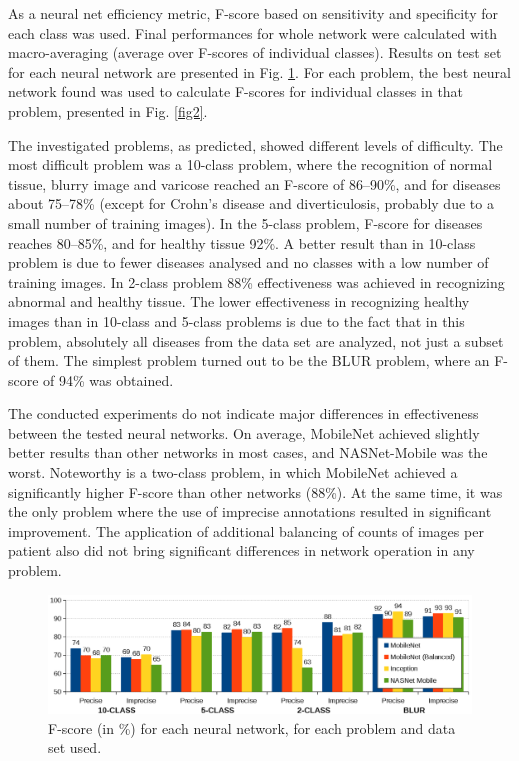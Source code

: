 \documentclass[preprint]{article}
\renewcommand{\onecolumn}{}
\begin{document}
\pagebreak  %

As a neural net efficiency metric, F-score based on sensitivity and specificity for each class was used. Final performances for whole network were calculated with macro-averaging (average over F-scores of individual classes). Results on test set for each neural network are presented in Fig. \ref{fig1}. For each problem, the best neural network found was used to calculate F-scores for individual classes in that problem, presented in Fig. \ref{fig2}.

The investigated problems, as predicted, showed different levels of difficulty. The most difficult problem was a 10-class problem, where the recognition of normal tissue, blurry image and varicose reached an F-score of 86--90\%, and for diseases about 75--78\% (except for Crohn's disease and diverticulosis, probably due to a small number of training images).  In the 5-class problem, F-score for diseases reaches 80--85\%, and for healthy tissue 92\%. A better result than in 10-class problem is due to fewer diseases analysed and no classes with a low number of training images. In 2-class problem 88\% effectiveness was achieved in recognizing abnormal and healthy tissue. The lower effectiveness in recognizing healthy images than in 10-class and 5-class problems is due to the fact that in this problem, absolutely all diseases from the data set are analyzed, not just a subset of them. The simplest problem turned out to be the BLUR problem, where an F-score of 94\% was obtained.

The conducted experiments do not indicate major differences in effectiveness between the tested neural networks. On average, MobileNet achieved slightly better results than other networks in most cases, and NASNet-Mobile was the worst. Noteworthy is a two-class problem, in which MobileNet achieved a significantly higher F-score than other networks (88\%). At the same time, it was the only problem where the use of imprecise annotations resulted in significant improvement. The application of additional balancing of counts of images per patient also did not bring significant differences in network operation in any problem. 



\onecolumn
\begin{figure}[ht]
\includegraphics[width=\textwidth]{fscore_networks.png}
\caption{F-score (in \%)  for each neural network, for each problem and data set used.}
\label{fig1}
\end{figure}
\end{document}
